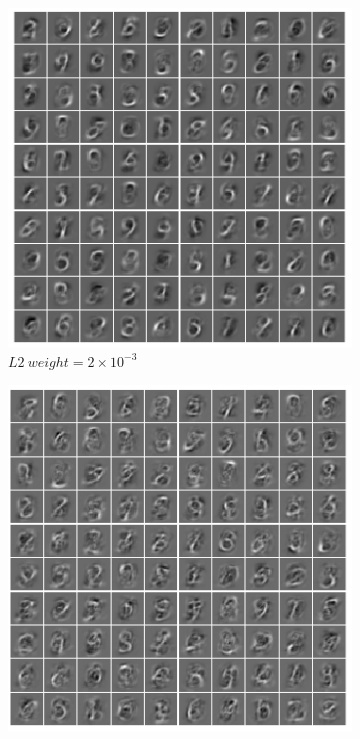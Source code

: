 \documentclass[a4paper, 10pt]{article}
\begin{document}
  \begin{figure}[htb]
    \centering
    \hfill
    \begin{subfigure}[t]{0.25\linewidth}
      \includegraphics[width=1\linewidth]{lab4/weights_default.png}
      \caption{$L2\ weight = 2 \times 10^{-3}$}
    \end{subfigure}
    \hfill
    \begin{subfigure}[t]{0.245\linewidth}
      \includegraphics[width=1\linewidth]{lab4/weights_regulariz1e-3.png}

\end{subfigure}
\end{figure}
\end{document}
